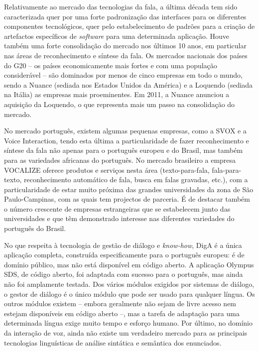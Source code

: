 \begin{multicols}{2}
Relativamente ao mercado das tecnologias da fala, a última década tem sido caracterizada quer por uma forte padronização das interfaces para os di\-fe\-ren\-tes componentes tecnológicos, quer pelo es\-ta\-be\-le\-ci\-men\-to de padrões para a criação de artefactos específicos de \textit{software} para uma determinada aplicação. Houve também uma forte consolidação do mercado nos últimos 10 anos, em particular nas áreas de reconhecimento e síntese da fala. Os mercados nacionais dos países do G20 – os países economicamente mais fortes e com uma população considerável – são dominados por menos de cinco empresas em todo o mundo, sendo a Nuance (sediada nos Estados Unidos da América) e a Loquendo (sediada na Itália) as empresas mais proeminentes. Em 2011, a Nuance anunciou a aquisição da Loquendo, o que representa mais um passo na consolidação do mercado.

No mercado português, existem algumas pequenas empresas, como a SVOX e a Voice Interaction, tendo esta última a particularidade de fazer reconhecimento e síntese da fala não apenas para o português europeu e do Brasil, mas também para as variedades africanas do português. No mercado brasileiro a empresa VOCALIZE oferece produtos e serviços nesta área (texto-para-fala, fala-para-texto, reconhecimento automático de fala, busca em falas gravadas, etc.), com a particularidade de estar muito próxima das grandes universidades da zona de São Paulo-Campinas\cite{neto}, com as quais tem projectos de parceria. É de destacar também o número crescente de empresas estrangeiras que se estabelecem junto das universidades e que têm demonstrado interesse nas diferentes variedades do português do Brasil.

No que respeita à tecnologia de gestão de diá\-lo\-go e \textit{know-how}, DigA é a única aplicação completa, construída especificamente para o português europeu: é de domínio público, mas não está disponível em código aberto. A aplicação Olympus SDS, de código aberto, foi adaptada com sucesso para o português, mas ainda não foi amplamente testada. Dos vários módulos exigidos por sistemas de diálogo, o gestor de diálogo é o único módulo que pode ser usado para qualquer língua. Os outros módulos existem – embora geralmente não sejam de livre acesso nem estejam disponíveis em código aberto –, mas a tarefa de adaptação para uma determinada língua exige muito tempo e esforço humano. Por último, no domínio da interação de voz, ainda não existe um verdadeiro mercado para as principais tecnologias linguísticas de análise sintática e semântica dos enunciados.


\end{multicols}
